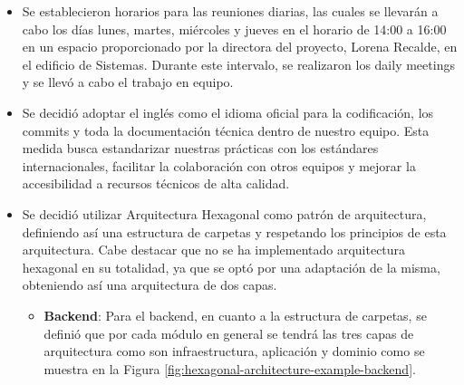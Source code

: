 \begin{itemize}
\begin{enumerate}
        En la Figura \ref{fig:azure-devops-project} se muestra el proyecto en Azure DevOps.
        \begin{figure}[H]
            \centering
            \texttt{[image: 02Figures//02Chapter//Sprints//Sprint-0/azure-devops-project.png]}
            \caption{Proyecto en Azure DevOps}
            \label{fig:azure-devops-project}
        \end{figure}
        \item Se optó por Visual Studio Code como editor de código para el frontend y PyCharm como IDE de desarrollo especializado para el backend. Esta elección proporcionó un entorno flexible y eficaz para la colaboración en el proyecto.
    \end{enumerate}

    \item Se establecieron horarios para las reuniones diarias, las cuales se llevarán a cabo los días lunes, martes, miércoles y jueves en el horario de 14:00 a 16:00 en un espacio proporcionado por la directora del proyecto, Lorena Recalde, en el edificio de Sistemas. Durante este intervalo, se realizaron los daily meetings y se llevó a cabo el trabajo en equipo.

    \item Se  decidió adoptar el inglés como el idioma oficial para la codificación, los commits y toda la documentación técnica dentro de nuestro equipo. Esta medida busca estandarizar nuestras prácticas con los estándares internacionales, facilitar la colaboración con otros equipos y mejorar la accesibilidad a recursos técnicos de alta calidad.

    \item Se decidió utilizar Arquitectura Hexagonal \cite{ARQUITECTURA-HEXAGONAL} como patrón de arquitectura, definiendo así una estructura de carpetas y respetando los principios de esta arquitectura. Cabe destacar que no se ha implementado arquitectura hexagonal en su totalidad, ya que se optó por una adaptación de la misma, obteniendo así una arquitectura de dos capas.
    \begin{itemize}
        \item \textbf{Backend}: Para el backend, en cuanto a  la estructura de carpetas, se definió que por cada módulo en general se tendrá las tres  capas de arquitectura como son infraestructura, aplicación y dominio como se muestra en la Figura \ref{fig:hexagonal-architecture-example-backend}.


\end{itemize}
\end{itemize}
